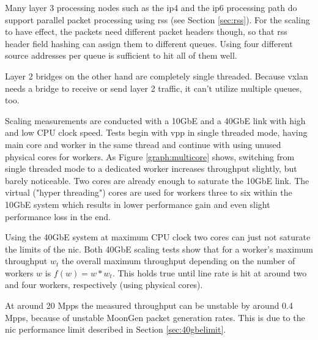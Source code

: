 Many layer 3 processing nodes such as the \Ac{ip4} and the \Ac{ip6}
processing path do support parallel packet processing using \Ac{rss}
(see Section \ref{sec:rss}). For the scaling to have effect, the
packets need different packet headers though, so that \Ac{rss} header
field hashing can assign them to different queues. Using four
different source addresses per queue is sufficient to hit all of them
well.

Layer 2 bridges on the other hand are completely single threaded.
Because \Ac{vxlan} needs a bridge to receive or send layer 2 traffic,
it can't utilize multiple queues, too.

Scaling measurements are conducted with a 10GbE and a 40GbE link with
high and low CPU clock speed. Tests begin with \Ac{vpp} in
single threaded mode, having main core and worker in the same thread
and continue with using unused physical cores for workers.
As Figure \ref{graph:multicore} shows, switching from single threaded
mode to a dedicated worker increases throughput slightly, but barely
noticeable. Two cores are already enough to saturate the 10GbE link.
The virtual ("hyper threading") cores are used for workers three to
six within the 10GbE system which results in lower performance gain
and even slight performance loss in the end.

Using the 40GbE system at maximum CPU clock two cores can just not
saturate the limits of the \Ac{nic}. Both 40GbE scaling tests show
that for a worker's maximum throughput $w_{t}$ the overall maximum
throughput depending on the number of workers $w$ is $f(w) = w *
w_{t}$. This holds true until line rate is hit at around two and four
workers, respectively (using physical cores).

At around 20 Mpps the measured throughput can be unstable by around 0.4
Mpps, because of unstable MoonGen packet generation rates. This is
due to the \Ac{nic} performance limit described in Section
\ref{sec:40gbelimit}.





